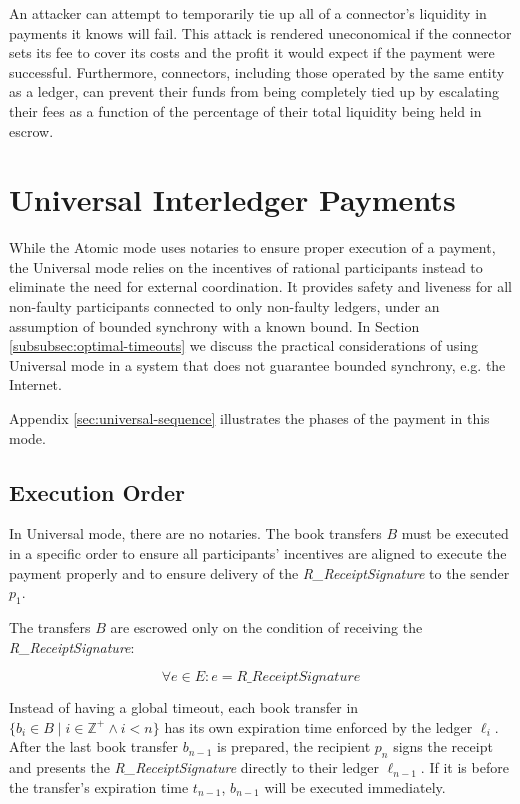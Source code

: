 \documentclass[letterpaper,twocolumn,10pt]{article}
\begin{document}
An attacker can attempt to temporarily tie up all of a connector's liquidity in payments it knows will fail. This attack is rendered uneconomical if the connector sets its fee to cover its costs and the profit it would expect if the payment were successful. Furthermore, connectors, including those operated by the same entity as a ledger, can prevent their funds from being completely tied up by escalating their fees as a function of the percentage of their total liquidity being held in escrow.

\newpage

\section{Universal Interledger Payments}
\label{sec:universal}

While the Atomic mode uses notaries to ensure proper execution of a payment, the Universal mode relies on the incentives of rational participants instead to eliminate the need for external coordination. It provides safety and liveness for all non-faulty participants connected to only non-faulty ledgers, under an assumption of bounded synchrony with a known bound. In Section \ref{subsubsec:optimal-timeouts} we discuss the practical considerations of using Universal mode in a system that does not guarantee bounded synchrony, e.g. the Internet.

Appendix \ref{sec:universal-sequence} illustrates the phases of the payment in this mode.


\subsection{Execution Order}

In Universal mode, there are no notaries. The book transfers $B$ must be executed in a specific order to ensure all participants' incentives are aligned to execute the payment properly and to ensure delivery of the \textit{R\_ReceiptSignature} to the sender $p_1$.

The transfers $B$ are escrowed only on the condition of receiving the \textit{R\_ReceiptSignature}:

\begin{equation}
\forall e \in E : e = \textit{R\_ReceiptSignature}
\end{equation}

Instead of having a global timeout, each book transfer in $ \{ b_i \in B \mid i \in \mathbb{Z}^+ \land i < n \} $ has its own expiration time enforced by the ledger $\ell_i$. 
After the last book transfer $b_{n-1}$ is prepared, the recipient $p_n$ signs the receipt and presents the \textit{R\_ReceiptSignature} directly to their ledger $\ell_{n-1}$. If it is before the transfer's expiration time $t_{n-1}$, $b_{n-1}$ will be executed immediately.
\end{document}
